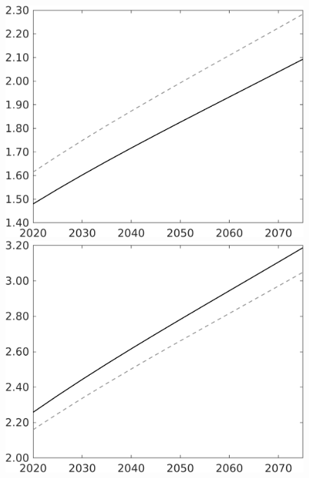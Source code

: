 \documentclass[12pt]{article}
\begin{document}
\begin{figure}[h!!]
\begin{minipage}[]{0.32\textwidth}
	\end{minipage}	
	\begin{minipage}[]{0.32\textwidth}
		\includegraphics[width=1\textwidth]{../../codding_model/own_basedOnFried/optimalPol_010922_revision/figures/all_13Sept22/CompTaul_Equlab_LFBAU_Reg0_Y_spillover0_nsk0_xgr1_knspil1_sep1_countec0_GovRev0_etaa0.79_lgd0.png}
	\end{minipage}	
	\begin{minipage}[]{0.32\textwidth}
		\includegraphics[width=1\textwidth]{../../codding_model/own_basedOnFried/optimalPol_010922_revision/figures/all_13Sept22/CompTaul_Equlab_LFBAU_Reg0_wh_spillover0_nsk0_xgr1_knspil1_sep1_countec0_GovRev0_etaa0.79_lgd0.png}

\end{minipage}
\end{figure}
\end{document}
